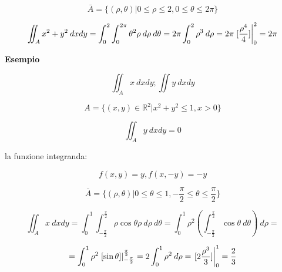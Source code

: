 \documentclass[../appunti-analisi.tex]{subfiles}
\begin{document}
\[
    \bar{A}  = \{(\rho,\theta) | 0 \le \rho \le 2, 0 \le \theta \le 2\pi\}
\]

\[
    \iint_A {x^{2}+y^{2}} \: d x d y = \int_{0}^{2} {\int_{0}^{2\pi} {\theta^{2} \rho} \: d \rho } \: d \theta = 2\pi \int_{0}^{2} {\rho^{3}} \: d \rho = 2\pi \left.[ \frac{\rho^{4}}{4}]\right\rvert_{0}^{2} = 2\pi 
\]

\textbf{Esempio} 

\[
\iint_A {x} \: dx d y; \iint {y} \: d x d y  
\]

\[
    A = \{(x,y) \in \mathbb{R}^{2} | x^{2}+y^{2} \le 1, x>0\}
\]

\[
    \iint_A {y} \: d x d y =0 
\]

la funzione integranda:

\[
    f(x,y) = y, f(x,-y) = -y
\]

\[
    \bar{A} = \{(\rho,\theta) | 0 \le \theta \le 1, - \frac{\pi}{2} \le \theta \le \frac{\pi}{2}\}
\]

\[
    \iint_A {x} \: d x d y  = \int_{0}^{1} {\int_{- \frac{\pi}{2}}^{ \frac{\pi}{2}} {\rho \cos \theta \rho} \: d \rho } \: d \theta = \int_{0}^{1} {\rho^{2} \left(\int_{- \frac{\pi}{2}}^{ \frac{\pi}{2}} {\cos \theta} \: d \theta \right)} \: d \rho =  
\]

\[
    =\int_{0}^{1} {\rho^{2}\left.[\sin \theta]\right\rvert_{ - \frac{\pi}{2}}^{ \frac{\pi}{2}} } = 2 \int_{0}^{1} {\rho^{2}} \: d \rho = \left.[2 \frac{\rho^{3}}{3} ]\right\rvert_{0}^{1} = \frac{2}{3}
\]
\end{document}
